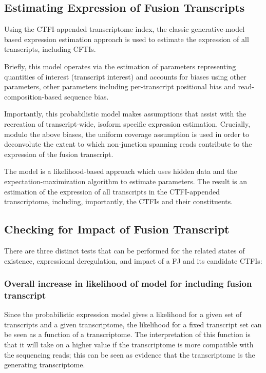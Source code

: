 \subsection{Estimating Expression of Fusion Transcripts}
Using the CTFI-appended transcriptome index, the classic generative-model based expression estimation approach is used to estimate the expression of all transcripts, including CFTIs.

Briefly, this model\cite{trapnell_transcript_2010}\cite{roberts_improving_2011}\cite{roberts_fragment_2013} operates via the estimation of parameters representing quantities of interest (transcript interest) and accounts for biases using other parameters, other parameters including per-transcript positional bias and read-composition-based sequence bias.

Importantly, this probabilistic model makes assumptions that assist with the recreation of transcript-wide, isoform specific expression estimation. Crucially, modulo the above biases, the uniform coverage assumption is used in order to deconvolute the extent to which non-junction spanning reads contribute to the expression of the fusion transcript.

The model is a likelihood-based approach which uses hidden data and the expectation-maximization\cite{tipping_mixtures_1999} algorithm to estimate parameters. The result is an estimation of the expression of all transcripts in the CTFI-appended transcriptome, including, importantly, the CTFIs and their constituents.

\subsection{Checking for Impact of Fusion Transcript}

There are three distinct tests that can be performed for the related states of existence, expressional deregulation, and impact of a FJ and its candidate CTFIs:

\subsubsection{Overall increase in likelihood of model for including fusion transcript}

Since the probabilistic expression model gives a likelihood for a given set of transcripts and a given transcriptome, the likelihood for a fixed transcript set can be seen as a function of a transcriptome. The interpretation of this function is that it will take on a higher value if the transcriptome is more compatible with the sequencing reads; this can be seen as evidence that the transcriptome is the generating transcriptome.


